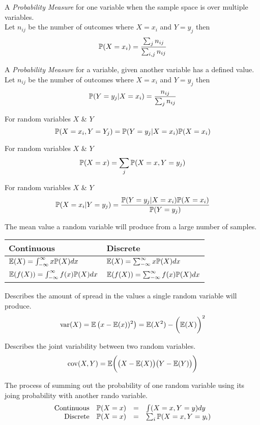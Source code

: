 \documentclass[11pt,a4paper]{article}
\begin{document}
A \textit{Probability Measure} for one variable when the sample space is over multiple variables.\\
Let $n_{ij}$ be the number of outcomes where $X=x_i$ and $Y=y_j$ then
$$\mathbb{P}(X=x_i)=\frac{\sum_jn_{ij}}{\sum_{i,j}n_{ij}}$$

A \textit{Probability Measure} for a variable, given another variable has a defined value.
Let $n_{ij}$ be the number of outcomes where $X=x_i$ and $Y=y_j$ then
$$\mathbb{P}(Y=y_j|X=x_i)=\frac{n_{ij}}{\sum_{j}n_{ij}}$$

For random variables $X$ \& $Y$
$$\mathbb{P}(X=x_i,Y=Y_j)=\mathbb{P}(Y=y_j|X=x_i)\mathbb{P}(X=x_i)$$

For random variables $X$ \& $Y$
$$\mathbb{P}(X=x)=\sum_j\mathbb{P}(X=x,Y=y_j)$$

For random variables $X$ \& $Y$
$$\mathbb{P}(X=x_i|Y=y_j)=\frac{\mathbb{P}(Y=y_j|X=x_i)\mathbb{P}(X=x_i)}{\mathbb{P}(Y=y_j)}$$

The mean value a random variable will produce from a large number of samples.\\
\begin{tabular}{l|l}
Continuous&Discrete\\\hline
$\mathbb{E}(X)=\int_{-\infty}^{\infty} x\mathbb{P}(X)dx$&$\mathbb{E}(X)=\sum_{-\infty}^{\infty} x\mathbb{P}(X)dx$\\
$\mathbb{E}(f(X))=\int_{-\infty}^{\infty} f(x)\mathbb{P}(X)dx$&$\mathbb{E}(f(X))=\sum_{-\infty}^{\infty} f(x)\mathbb{P}(X)dx$
\end{tabular}

Describes the amount of spread in the values a single random variable will produce.
$$\mathrm{var}(X)=\mathbb{E}\left(x-\mathbb{E}(x))^2\right)=\mathbb{E}(X^2)-\bigg(\mathbb{E}(X)\bigg)^2$$

Describes the joint variability between two random variables.
$$\mathrm{cov}(X,Y)=\mathbb{E}\bigg(\big(X-\mathbb{E}(X)\big)\big(Y-\mathbb{E}(Y)\big)\bigg)$$

The process of summing out the probability of one random variable using its joing probability with another rando variable.
\[\begin{array}{rrcl}
\mathrm{Continuous}&\mathbb{P}(X=x)&=&\int(X=x,Y=y)dy\\
\mathrm{Discrete}&\mathbb{P}(X=x)&=&\sum_i\mathbb{P}(X=x,Y=y_i)
\end{array}\]
\end{document}
